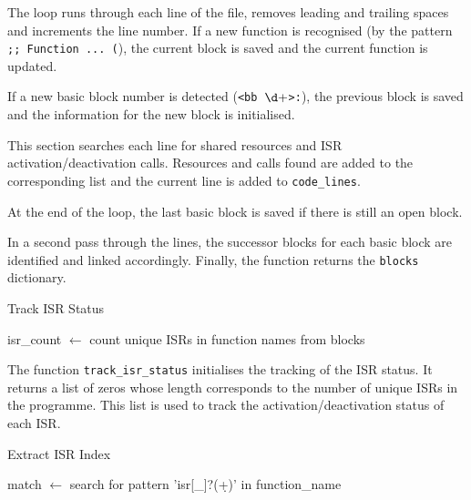 \documentclass[
fancyheadings, %
%
%
]{stsreprt}
\begin{document}
{		
		The loop runs through each line of the file, removes leading and trailing spaces and increments the line number. If a new function is recognised (by the pattern \texttt{;; Function ... (}), the current block is saved and the current function is updated.
		
		If a new basic block number is detected (\texttt{<bb \(\d+\)>:}), the previous block is saved and the information for the new block is initialised.
		
		This section searches each line for shared resources and ISR activation/deactivation calls. Resources and calls found are added to the corresponding list and the current line is added to \texttt{code\_lines}.
		
		At the end of the loop, the last basic block is saved if there is still an open block.
		
		In a second pass through the lines, the successor blocks for each basic block are identified and linked accordingly. Finally, the function returns the \texttt{blocks} dictionary.
		
		\begin{algorithm}[H]
			\caption{Track ISR Status}
			\DontPrintSemicolon
			\SetAlgoLined
			\BlankLine
			isr\_count $\gets$ count unique ISRs in function names from blocks\;
		\end{algorithm}
		
		The function \texttt{track\_isr\_status} initialises the tracking of the ISR status. It returns a list of zeros whose length corresponds to the number of unique ISRs in the programme. This list is used to track the activation/deactivation status of each ISR.
		
		\begin{algorithm}[H]
			\caption{Extract ISR Index}
			\DontPrintSemicolon
			\SetAlgoLined
			\BlankLine
			match $\gets$ search for pattern 'isr[\_]?(\d+)' in function\_name\;
		\end{algorithm}
		
}
\end{document}
